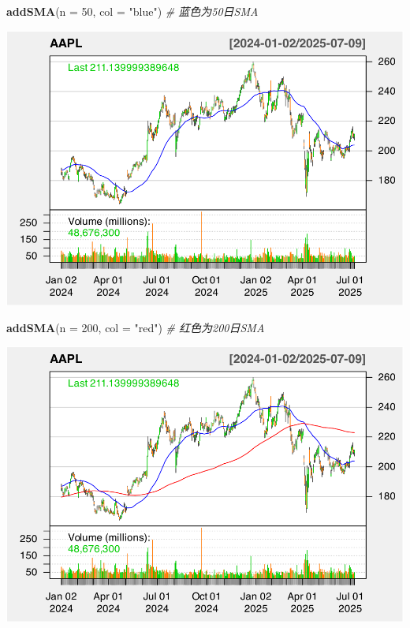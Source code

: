 \documentclass[]{ctexbook}
\newenvironment{Shaded}{\begin{snugshade}}{\end{snugshade}}
\newcommand{\AttributeTok}[1]{\textcolor[rgb]{0.13,0.29,0.53}{#1}}
\newcommand{\CommentTok}[1]{\textcolor[rgb]{0.56,0.35,0.01}{\textit{#1}}}
\newcommand{\DecValTok}[1]{\textcolor[rgb]{0.00,0.00,0.81}{#1}}
\newcommand{\FunctionTok}[1]{\textcolor[rgb]{0.13,0.29,0.53}{\textbf{#1}}}
\newcommand{\NormalTok}[1]{#1}
\newcommand{\StringTok}[1]{\textcolor[rgb]{0.31,0.60,0.02}{#1}}
\begin{document}
\begin{Shaded}
\begin{Highlighting}[]
\FunctionTok{addSMA}\NormalTok{(}\AttributeTok{n =} \DecValTok{50}\NormalTok{, }\AttributeTok{col =} \StringTok{"blue"}\NormalTok{)  }\CommentTok{\# 蓝色为50日SMA}
\end{Highlighting}
\end{Shaded}

\includegraphics[width=0.9\linewidth]{quantmod_files/figure-latex/sma-2}

\begin{Shaded}
\begin{Highlighting}[]
\FunctionTok{addSMA}\NormalTok{(}\AttributeTok{n =} \DecValTok{200}\NormalTok{, }\AttributeTok{col =} \StringTok{"red"}\NormalTok{)  }\CommentTok{\# 红色为200日SMA}
\end{Highlighting}
\end{Shaded}

\includegraphics[width=0.9\linewidth]{quantmod_files/figure-latex/sma-3}
\end{document}
